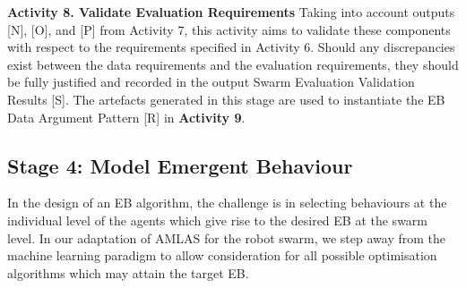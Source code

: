 \documentclass[runningheads]{llncs}
\begin{document}
\noindent\textbf{Activity 8. Validate Evaluation Requirements} Taking into account outputs [N], [O], and [P] from Activity 7, this activity aims to validate these components with respect to the requirements specified in Activity 6. Should any discrepancies exist between the data requirements and the evaluation requirements, they should be fully justified and recorded in the output Swarm Evaluation Validation Results [S]. 
The artefacts generated in this stage are used to instantiate the EB Data Argument Pattern [R] in \textbf{Activity 9}.

\subsection{Stage 4: Model Emergent Behaviour} \label{framework-stage4}
In the design of an EB algorithm, the challenge is in selecting behaviours at the individual level of the agents which give rise to the desired EB at the swarm level. 
In our adaptation of AMLAS for the robot swarm,  we step away from the machine learning paradigm to allow consideration for all possible optimisation algorithms which may attain the target EB.
\end{document}
